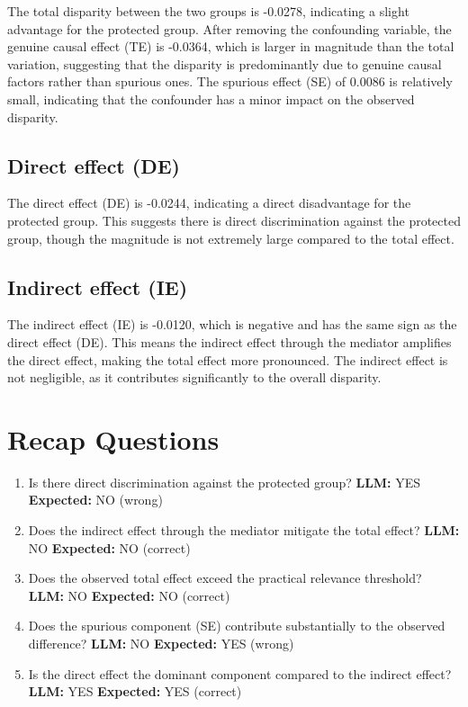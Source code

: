\documentclass[11pt]{article}
\begin{document}
The total disparity between the two groups is -0.0278, indicating a slight advantage for the protected group. After removing the confounding variable, the genuine causal effect (TE) is -0.0364, which is larger in magnitude than the total variation, suggesting that the disparity is predominantly due to genuine causal factors rather than spurious ones. The spurious effect (SE) of 0.0086 is relatively small, indicating that the confounder has a minor impact on the observed disparity.

\subsection{Direct effect (DE)}

The direct effect (DE) is -0.0244, indicating a direct disadvantage for the protected group. This suggests there is direct discrimination against the protected group, though the magnitude is not extremely large compared to the total effect.

\subsection{Indirect effect (IE)}

The indirect effect (IE) is -0.0120, which is negative and has the same sign as the direct effect (DE). This means the indirect effect through the mediator amplifies the direct effect, making the total effect more pronounced. The indirect effect is not negligible, as it contributes significantly to the overall disparity.

\section{Recap Questions}

\begin{enumerate}
\item Is there direct discrimination against the protected group? \textbf{LLM:} YES \quad \textbf{Expected:} NO \quad (wrong)
\item Does the indirect effect through the mediator mitigate the total effect? \textbf{LLM:} NO \quad \textbf{Expected:} NO \quad (correct)
\item Does the observed total effect exceed the practical relevance threshold? \textbf{LLM:} NO \quad \textbf{Expected:} NO \quad (correct)
\item Does the spurious component (SE) contribute substantially to the observed difference? \textbf{LLM:} NO \quad \textbf{Expected:} YES \quad (wrong)
\item Is the direct effect the dominant component compared to the indirect effect? \textbf{LLM:} YES \quad \textbf{Expected:} YES \quad (correct)
\end{enumerate}
\end{document}
